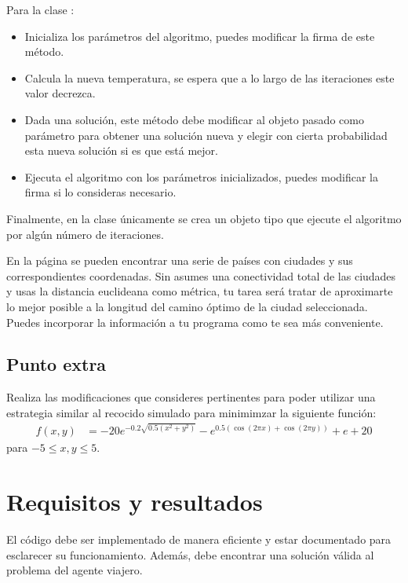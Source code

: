 Para la clase :
\begin{itemize}
 \item {}
 
 Inicializa los parámetros del algoritmo, puedes modificar la firma de este método.
 
 \item {}
 
 Calcula la nueva temperatura, se espera que a lo largo de las iteraciones este valor decrezca.
 
 \item {}
 
 Dada una solución, este método debe modificar al objeto pasado como parámetro para obtener una solución nueva y elegir con cierta probabilidad esta nueva solución si es que está mejor.
 
 \item {}
 
 Ejecuta el algoritmo con los parámetros inicializados, puedes modificar la firma si lo consideras necesario.
\end{itemize}

Finalmente, en la clase  únicamente se crea un objeto tipo  que ejecute el algoritmo por algún número de iteraciones.

En la página  se pueden encontrar una serie de países con ciudades y sus correspondientes coordenadas.  Sin asumes una conectividad total de las ciudades y usas la distancia euclideana como métrica, tu tarea será tratar de aproximarte lo mejor posible a la longitud del camino óptimo de la ciudad seleccionada.  Puedes incorporar la información a tu programa como te sea más conveniente.

\subsection{Punto extra}

Realiza las modificaciones que consideres pertinentes para poder utilizar una estrategia similar al recocido simulado para minimimzar la siguiente función:
\begin{align*}
 f(x,y) &= -20 e^{-0.2 \sqrt{0.5(x^2 + y^2)}} - e^{0.5 (\cos(2 \pi x) + \cos(2 \pi y))} + e + 20
\end{align*}
para $-5 \leq x,y \leq 5$.


\section{Requisitos y resultados}

El código debe ser implementado de manera eficiente y estar documentado para esclarecer su funcionamiento.  Además, debe encontrar una solución válida al problema del agente viajero.
